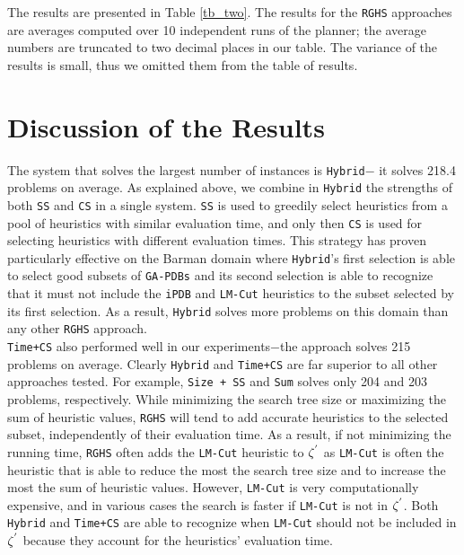 The results are presented in Table \ref{tb_two}. The results for the \texttt{RGHS} approaches are averages computed over 10 independent runs of the planner; the average numbers are truncated to two decimal places in our table. The variance of the results is small, thus we omitted them from the table of results.\\

\section{Discussion of the Results}
\noindent
The system that solves the largest number of instances is \texttt{Hybrid}$-$ it solves 218.4 problems on average. As explained above, we combine in \texttt{Hybrid} the strengths of both \texttt{SS} and \texttt{CS} in a single system. \texttt{SS} is used to greedily select heuristics from a pool of heuristics with similar evaluation time, and only then \texttt{CS} is used for selecting heuristics with different evaluation times. This strategy has proven particularly effective on the Barman domain where \texttt{Hybrid}'s first selection is able to select good subsets of \texttt{GA-PDBs} and its second selection is able to recognize that it must not include the \texttt{iPDB} and \texttt{LM-Cut} heuristics to the subset selected by its first selection. As a result, \texttt{Hybrid} solves more problems on this domain than any other \texttt{RGHS} approach.\\

\texttt{Time+CS} also performed well in our experiments$-$the approach solves 215 problems on average. Clearly \texttt{Hybrid} and \texttt{Time+CS} are far superior to all other approaches tested. For example, \texttt{Size + SS} and \texttt{Sum} solves only 204 and 203 problems, respectively. While minimizing the search tree size or maximizing the sum of heuristic values, \texttt{RGHS} will tend to add accurate heuristics to the selected subset, independently of their evaluation time. As a result, if not minimizing the running time, \texttt{RGHS} often adds the \texttt{LM-Cut} heuristic to $\zeta\sp{'}$ as \texttt{LM-Cut} is often the heuristic that is able to reduce the most the search tree size and to increase the most the sum of heuristic values. However, \texttt{LM-Cut} is very computationally expensive, and in various cases the search is faster if \texttt{LM-Cut} is not in $\zeta\sp{'}$. Both \texttt{Hybrid} and \texttt{Time+CS} are able to recognize when \texttt{LM-Cut} should not be included in $\zeta\sp{'}$ because they account for the heuristics' evaluation time.\\

